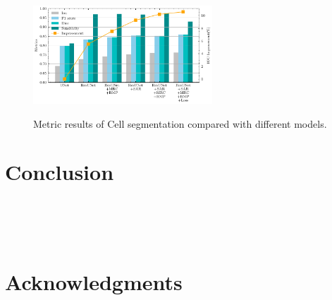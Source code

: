 \documentclass[UTF8]{article} %
\begin{document}
  \begin{figure}[ht]
    \begin{center}
    \includegraphics[width=0.6\textwidth]{cell_comparison.pdf}
    \vspace{-2mm}
    \caption{Metric results of Cell segmentation compared with different models.} 
    \vspace{-2mm}
    \label{fig:cell_comparison}
    \end{center}
    \vspace{-0.35cm}
  \end{figure}
\section{Conclusion}
~\\
~\\
~\\

\section*{Acknowledgments}
~\\
~\\
~\\



\end{document}
